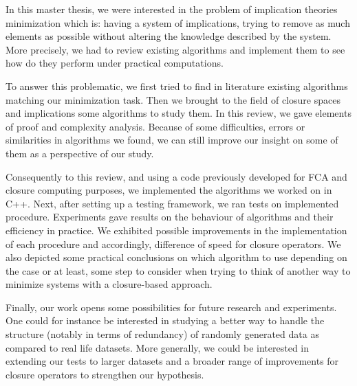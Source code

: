\documentclass[a4paper, 10pt]{report}
\begin{document}
In this master thesis, we were interested in the problem of implication theories minimization which is: having a system of implications, trying to remove as much elements as possible without altering the knowledge described by
the system. More precisely, we had to review existing algorithms and implement them to see how do they perform under practical computations.

\vspace{1.2em}

To answer this problematic, we first tried to find in literature existing algorithms matching our minimization task. Then we brought to the field of closure spaces and implications some algorithms to study them. In this review, we gave elements of proof and complexity analysis. Because of some difficulties, errors or similarities in algorithms we found, we can still improve our insight on some of them as a perspective of our study.

\vspace{1.2em}

Consequently to this review, and using a code previously developed for FCA and closure computing purposes, we implemented the algorithms we worked on in C++. Next, after setting up a testing framework, we ran tests on implemented procedure. Experiments gave results on the behaviour of algorithms
and their efficiency in practice. We exhibited  possible improvements in the implementation of each procedure and accordingly, difference of speed
for closure operators. We also depicted some practical conclusions on which algorithm to use depending on the case or at least, some step to consider when trying to think of another way to minimize systems with a closure-based approach.

\vspace{1.2em}

Finally, our work opens some possibilities for future research and experiments. One could for instance be interested in studying a better way to handle the structure (notably in terms of redundancy) of randomly generated data as compared to real life datasets. More generally, we could be interested in extending our tests to larger datasets and a broader range of improvements for closure operators to strengthen our hypothesis.




\newpage
{}
\setcounter{page}{8}


	

\newpage
\end{document}
